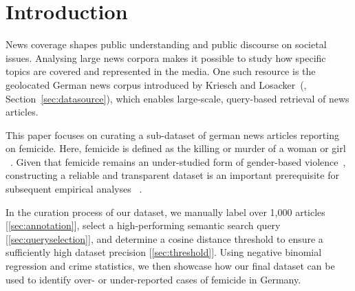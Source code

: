 \documentclass{article}
\begin{document}

\section{Introduction}\label{sec:intro}
News coverage shapes public understanding and public discourse on societal issues.
Analysing large news corpora makes it possible to study how specific topics are
covered and represented in the media.
One such resource is the geolocated German news corpus introduced by
Kriesch and Losacker~(\citeyear{kreischlosacker2025geolocated}, Section~\ref{sec:datasource}), which enables large-scale, query-based retrieval
of news articles.

This paper focuses on curating a sub-dataset of german news articles reporting on femicide. Here, femicide is defined as the killing or murder of a woman or girl ~\citep{eige2023femicide}. 
Given that femicide remains an under-studied form of gender-based
violence~\citep{ReisMeyer2024Femicide}, constructing a reliable and transparent
dataset is an important prerequisite for subsequent empirical analyses ~\cite{dignazio_feminicide_2022}.

In the curation process of our dataset, we manually label over 1,000 articles [\ref{sec:annotation}], select a high-performing semantic search query [\ref{sec:queryselection}], and determine a cosine distance threshold to
ensure a sufficiently high dataset precision [\ref{sec:threshold}]. Using negative binomial regression and crime statistics, we then showcase how our final dataset can be used to identify over- or under-reported cases of femicide in Germany. 


\end{document}
